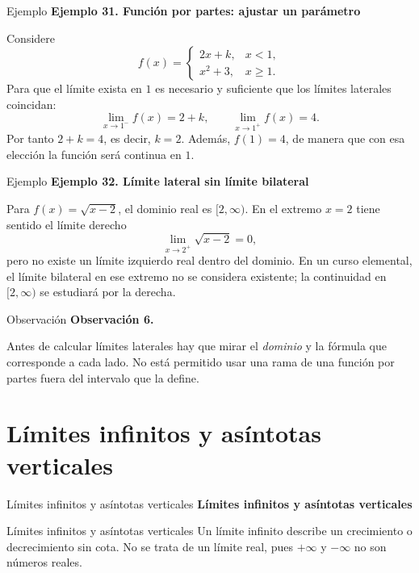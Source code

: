 \documentclass[12pt,aspectratio=169]{beamer}
\begin{document}
\begin{frame}[t,allowframebreaks]{Ejemplo}
{\color{azul}\bfseries Ejemplo 31. Función por partes: ajustar un parámetro}\par\medskip

Considere
\[
 f(x)=\begin{cases}2x+k,&x<1,\\x^2+3,&x\ge1.\end{cases}
\]
Para que el límite exista en $1$ es necesario y suficiente que los límites laterales coincidan:
\[
 \lim_{x\to1^-}f(x)=2+k,\qquad
 \lim_{x\to1^+}f(x)=4.
\]
Por tanto $2+k=4$, es decir, $\boxed{k=2}$. Además, $f(1)=4$, de manera que con esa elección la función será continua en $1$.
\end{frame}


\begin{frame}[t,allowframebreaks]{Ejemplo}
{\color{azul}\bfseries Ejemplo 32. Límite lateral sin límite bilateral}\par\medskip

Para $f(x)=\sqrt{x-2}$, el dominio real es $[2,\infty)$. En el extremo $x=2$ tiene sentido el límite derecho
\[
 \lim_{x\to2^+}\sqrt{x-2}=0,
\]
pero no existe un límite izquierdo real dentro del dominio. En un curso elemental, el límite bilateral en ese extremo no se considera existente; la continuidad en $[2,\infty)$ se estudiará por la derecha.
\end{frame}


\begin{frame}[t,allowframebreaks]{Observación}
{\color{azul}\bfseries Observación 6.}\par\medskip

Antes de calcular límites laterales hay que mirar el \emph{dominio} y la fórmula que corresponde a cada lado. No está permitido usar una rama de una función por partes fuera del intervalo que la define.
\end{frame}


\section{Límites infinitos y asíntotas verticales}

\begin{frame}[t]{Límites infinitos y asíntotas verticales}
\centering\vfill{\Large\bfseries\color{azul} Límites infinitos y asíntotas verticales}\vfill
\end{frame}


\begin{frame}[t,allowframebreaks]{Límites infinitos y asíntotas verticales}
Un límite infinito describe un crecimiento o decrecimiento sin cota. No se trata de un límite real, pues $+\infty$ y $-\infty$ no son números reales.
\end{frame}
\end{document}
